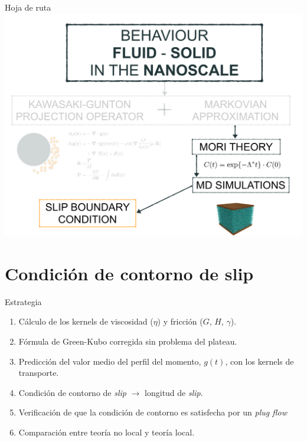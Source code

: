 \documentclass{beamer}
\begin{document}
\begin{frame}{Hoja de ruta}
  \includegraphics[width=\linewidth]{scheme-thesis-slip}
\end{frame}

\section{Condición de contorno de slip}
\begin{frame}{Estrategia}
  \begin{enumerate}
    \item Cálculo de los kernels de viscosidad ($\eta$) y fricción ($G$, $H$, $\gamma$).
    \item Fórmula de Green-Kubo corregida sin problema del plateau. 
    \item Predicción del valor medio del perfil del momento, $g(t)$, con los kernels de transporte.
    \item Condición de contorno de \textit{slip} $\rightarrow$ longitud de \textit{slip}. 
    \item Verificación de que la condición de contorno es satisfecha por un \textit{plug flow}
    \item Comparación entre teoría no local y teoría local. 
  \end{enumerate}
\end{frame}
\end{document}
